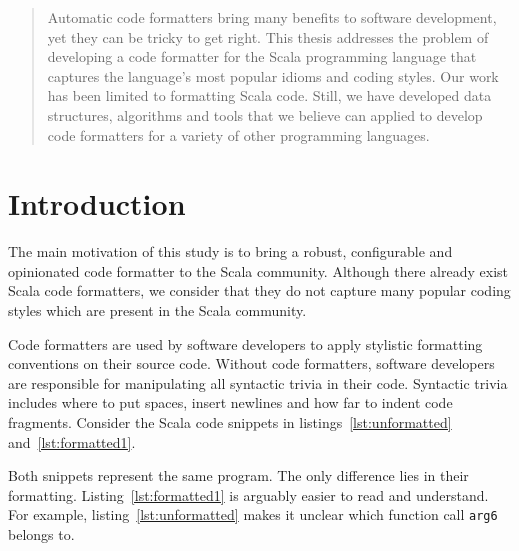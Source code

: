 \documentclass[11pt,a4paper]{article}
\newcommand{\scalafmt}{\texttt{scalafmt}}
\begin{document}






\begin{abstract}
  Automatic code formatters bring many benefits to software development, yet they can be tricky to get right.
  This thesis addresses the problem of developing a code formatter for the
  Scala programming language that captures the language's most popular idioms
  and coding styles.
  Our work has been limited to formatting Scala code.
  Still, we have developed data structures, algorithms and tools that we
  believe can applied to develop code formatters for a variety of other
  programming languages.
\end{abstract}
\tableofcontents
% 
\pagebreak
\section{Introduction} %
\label{sec:Introduction}
\lstset{style=scala}

The main motivation of this study is to bring a robust, configurable and opinionated code formatter to the Scala community.
Although there already exist Scala code formatters,
we consider that they do not capture many popular coding styles which are present in the Scala community.

Code formatters are used by software developers to apply stylistic formatting conventions on their source code.
Without code formatters, software developers are responsible for manipulating all syntactic trivia in their code.
Syntactic trivia includes where to put spaces, insert newlines and how far to indent code fragments.
Consider the Scala code snippets in listings~\ref{lst:unformatted} and~\ref{lst:formatted1}.

\begin{minipage}{.45\textwidth}

\end{minipage}
\hfil
\begin{minipage}{.45\textwidth}

\end{minipage}
\hfil
Both snippets represent the same program.
The only difference lies in their formatting.
Listing~\ref{lst:formatted1} is arguably easier to read and understand.
For example, listing~\ref{lst:unformatted} makes it unclear which function call \texttt{arg6} belongs to.
\end{document}
